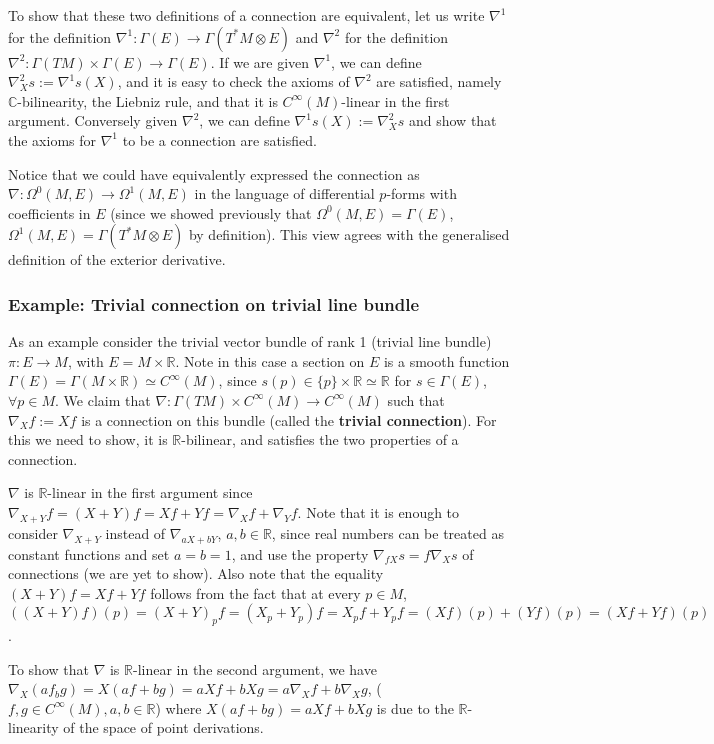 \documentclass[a4paper]{article}
\theoremstyle{definition} \newtheorem*{definition}{Definition}
\theoremstyle{definition} \newtheorem*{definitions}{Definitions}
\theoremstyle{plain} \newtheorem{theorem}{Theorem}[section]
\theoremstyle{plain} \newtheorem{proposition}[theorem]{Proposition}
\theoremstyle{plain} \newtheorem{corollary}[theorem]{Corollary}
\theoremstyle{plain} \newtheorem{lemma}[theorem]{Lemma}
\theoremstyle{plain} \newtheorem{example}[theorem]{Example}
\newcommand{\defn}[1]{\textbf{#1}}
\newcommand{\realnos}{\mathbb{R}}
\newcommand{\complexnos}{\mathbb{C}}
\newcommand{\smooth}{C^\infty}
\begin{document}
To show that these two definitions of a connection are equivalent, let us write $\nabla^1$ for the definition $\nabla^1:\Gamma(E)\to \Gamma(T^*M\otimes E)$ and $\nabla^2$ for the definition $\nabla^2:\Gamma(TM)\times \Gamma(E)\to \Gamma(E)$. If we are given $\nabla^1$, we can define $\nabla^2_X s:=\nabla^1 s(X)$, and it is easy to check the axioms of $\nabla^2$ are satisfied, namely $\complexnos$-bilinearity, the Liebniz rule, and that it is $\smooth(M)$-linear in the first argument. Conversely given $\nabla^2$, we can define $\nabla^1 s(X):=\nabla^2_X s$ and show that the axioms for $\nabla^1$ to be a connection are satisfied. 

Notice that we could have equivalently expressed the connection as $\nabla:\Omega^0(M, E)\to \Omega^1(M, E)$ in the language of differential $p$-forms with coefficients in $E$ (since we showed previously that $\Omega^0(M, E)=\Gamma(E)$, $\Omega^1(M, E)=\Gamma(T^*M\otimes E)$ by definition). This view agrees with the generalised definition of the exterior derivative.

\subsubsection{Example: Trivial connection on trivial line bundle}
As an example consider the trivial vector bundle of rank 1 (trivial line bundle)
$\pi:E\to M$, with $E=M\times \realnos$.
Note in this case a section on $E$ is a smooth function $\Gamma(E)=\Gamma(M\times \realnos)\simeq \smooth(M)$, since $s(p)\in \{p\}\times \realnos \simeq \realnos$ for $s\in \Gamma(E)$, $\forall p\in M$.
We claim that $\nabla: \Gamma(TM)\times \smooth(M)\to \smooth(M)$ such that $\nabla_X f := Xf$ is a connection on this bundle (called the \defn{trivial connection}). For this we need to show, it is $\realnos$-bilinear, and satisfies the two properties of a connection. 

$\nabla$ is $\realnos$-linear in the first argument since $\nabla_{X+Y}f=(X+Y)f=Xf+Yf=\nabla_Xf + \nabla_Yf$. Note that it is enough to consider $\nabla_{X+Y}$ instead of $\nabla_{aX+bY}$, $a,b\in \realnos$, since real numbers can be treated as constant functions and set $a=b=1$, and use the property $\nabla_{fX}s=f\nabla_X s$ of connections (we are yet to show). Also note that the equality $(X+Y)f=Xf+Yf$ follows from the fact that at every $p\in M$,
$((X+Y)f)(p)=(X+Y)_pf=(X_p+Y_p)f=X_pf+Y_pf=(Xf)(p)+(Yf)(p)=(Xf+Yf)(p)$.

To show that $\nabla$ is $\realnos$-linear in the second argument, we have $\nabla_X(af_bg)=X(af+bg)=aXf+bXg=a\nabla_Xf + b\nabla_X g$, ($f, g \in \smooth (M), a,b\in \realnos$) where $X(af+bg)=aXf+bXg$ is due to the $\realnos$-linearity of the space of point derivations. 
\end{document}
